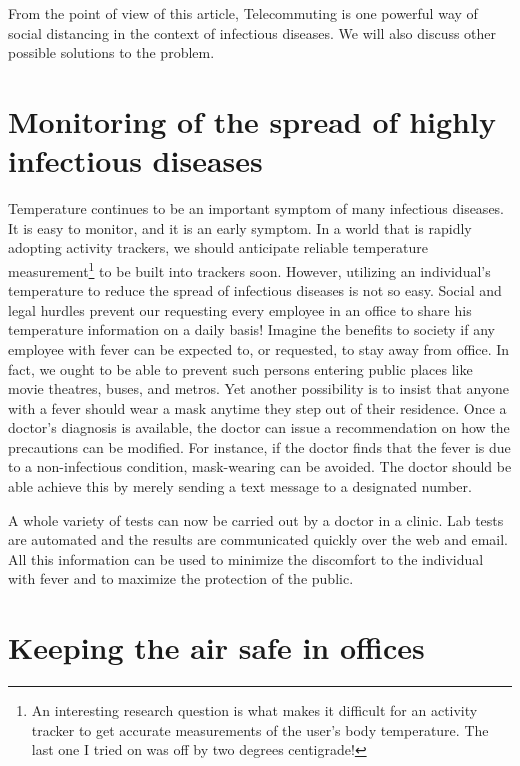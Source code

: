 \begin{multicols}{2}
From the point of view of this article, Telecommuting is one powerful way of social distancing in the context of infectious diseases. We will also discuss other possible solutions to the problem. 

\section{Monitoring of the spread of highly infectious diseases}\label{section-3}

Temperature continues to be an important symptom of many infectious diseases. It is easy to monitor, and it is an early symptom. In a world that is rapidly adopting activity trackers, we should anticipate reliable temperature measurement\footnote{An interesting research question is what makes it difficult for an activity tracker to get accurate measurements of the user’s body temperature. The last one I tried on was off by two degrees centigrade!} to be built into trackers soon. However, utilizing an individual’s temperature to reduce the spread of infectious diseases is not so easy. Social and legal hurdles prevent our requesting every employee in an office to share his temperature information on a daily basis! Imagine the benefits to society if any employee with fever can be expected to, or requested, to stay away from office. In fact, we ought to be able to prevent such persons entering public places like movie theatres, buses, and metros. Yet another possibility is to insist that anyone with a fever should wear a mask anytime they step out of their residence. Once a doctor’s diagnosis is available, the doctor can issue a recommendation on how the precautions can be modified. For instance, if the doctor finds that the fever is due to a non-infectious condition, mask-wearing can be avoided. The doctor should be able achieve this by merely sending a text message to a designated number.

A whole variety of tests can now be carried out by a doctor in a clinic. Lab tests are automated and the results are communicated quickly over the web and email. All this information can be used to minimize the discomfort to the individual with fever and to maximize the protection of the public. 

\vspace{-.3cm}

\section{Keeping the air safe in offices}\label{section-4}


\end{multicols}
